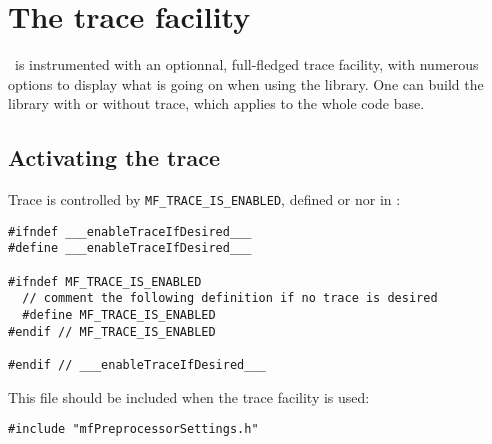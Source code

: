 



\chapter{The trace facility}


\mf\ is instrumented with an optionnal, full-fledged trace facility, with numerous options to display what is going on when using the library.
One can build the library with or without trace, which applies to the whole code base.

\section{Activating the trace}

Trace is controlled by {\tt MF_TRACE_IS_ENABLED}, defined or nor in :

\begin{lstlisting}[language=CPlusPlus]
#ifndef ___enableTraceIfDesired___
#define ___enableTraceIfDesired___

#ifndef MF_TRACE_IS_ENABLED
  // comment the following definition if no trace is desired
  #define MF_TRACE_IS_ENABLED
#endif // MF_TRACE_IS_ENABLED

#endif // ___enableTraceIfDesired___
\end{lstlisting}

This file should be included when the trace facility is used:
\begin{lstlisting}[language=CPlusPlus]
#include "mfPreprocessorSettings.h"
\end{lstlisting}

